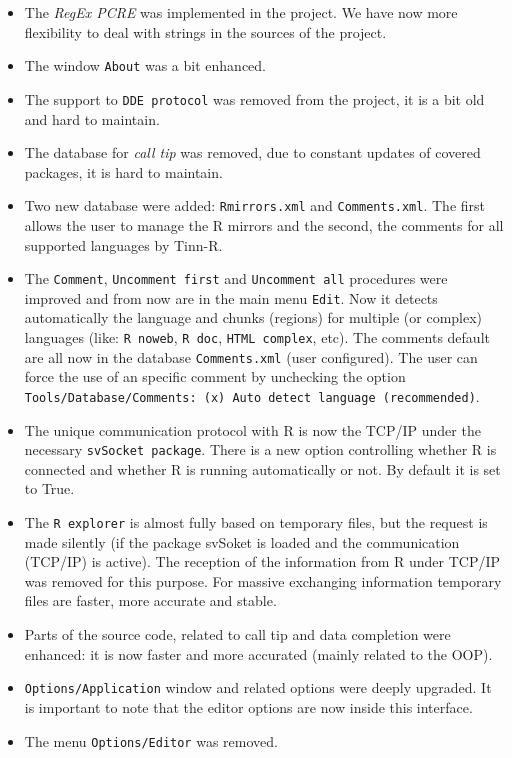 \begin{itemize}
  \item The \textit{RegEx PCRE} was implemented in the project.
   We have now more flexibility to deal with strings in the sources of the project.
  \item The window \texttt{About} was a bit enhanced.
  \item The support to \texttt{DDE protocol} was removed from the project, it is a bit
   old and hard to maintain.
  \item The database for \textit{call tip} was removed, due to constant updates of covered
   packages, it is hard to maintain.
  \item Two new database were added: \texttt{Rmirrors.xml} and \texttt{Comments.xml}.
   The first allows the user to manage the R mirrors and the second, the comments for all
   supported languages by Tinn-R.
  \item The \texttt{Comment}, \texttt{Uncomment first} and \texttt{Uncomment all}
   procedures were improved and from now are in the main menu \texttt{Edit}.
   Now it detects automatically the language and chunks (regions) for multiple (or complex) languages
   (like: \texttt{R noweb}, \texttt{R doc}, \texttt{HTML complex}, etc).
   The comments default are all now in the database \texttt{Comments.xml} (user configured).
   The user can force the use of an specific comment by unchecking the option
   \texttt{Tools/Database/Comments: (x) Auto detect language (recommended)}.
  \item The unique communication protocol with R is now the TCP/IP under the necessary
  \texttt{svSocket package}.
   There is a new option controlling whether R is connected and whether R is running automatically or not.
   By default it is set to True.
  \item The \texttt{R explorer} is almost fully based on temporary files, but the request is made silently
   (if the package svSoket is loaded and the communication (TCP/IP) is active).
   The reception of the information from R under TCP/IP was removed for this purpose.
   For massive exchanging information temporary files are faster, more accurate and stable.
  \item Parts of the source code, related to call tip and data completion were enhanced:
    it is now faster and more accurated (mainly related to the OOP).
  \item \texttt{Options/Application} window and related options were deeply upgraded.
    It is important to note that the editor options are now inside this interface.
  \item The menu \texttt{Options/Editor} was removed.

\end{itemize}
